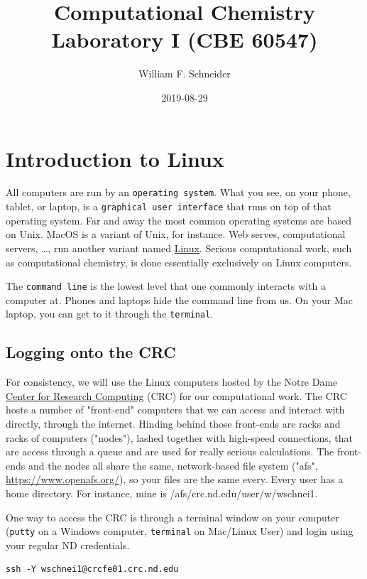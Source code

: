 \documentclass[11pt]{article}
\author{William F. Schneider}
\date{2019-08-29}
\title{Computational Chemistry Laboratory I (CBE 60547)}
\begin{document}
\maketitle

\section{Introduction to Linux}
\label{sec:org53da4e4}

All computers are run by an \texttt{operating system}.  What you see, on your phone, tablet, or
laptop, is a \texttt{graphical user interface} that runs on top of that operating system.  Far
and away the most common operating systems are based on Unix.  MacOS is a variant of Unix,
for instance. Web serves, computational servers, \ldots{}, run another variant named \href{https://www.linux.org/}{Linux}.
Serious computational work, such as computational chemistry, is done essentially
exclusively on Linux computers.

The \texttt{command line} is the lowest level that one commonly interacts with a computer at.
Phones and laptops hide the command line from us. On your Mac laptop, you can get to it
through the \texttt{terminal}.

\subsection{Logging onto the CRC}
\label{sec:org333bdc6}
For consistency, we will use the Linux computers hosted by the Notre Dame \href{http://crc.nd.edu}{Center for
Research Computing} (CRC) for our computational work. The CRC hosts a number of "front-end"
computers that we can access and interact with directly, through the internet.  Hinding
behind those front-ends are racks and racks of computers ("nodes"), lashed together with
high-speed connections, that are access through a queue and are used for really serious
calculations.  The front-ends and the nodes all share the same, network-based file system
("afs", \url{https://www.openafs.org/}), so your files are the same every.  Every user has a
home directory.  For instance, mine is /afs/crc.nd.edu/user/w/wschnei1.  

One way to access the CRC is through a terminal window on your computer (\texttt{putty} on a
Windows computer, \texttt{terminal} on Mac/Linux User) and login using your regular ND
credentials.

\begin{verbatim}
ssh -Y wschnei1@crcfe01.crc.nd.edu
\end{verbatim}
\end{document}
